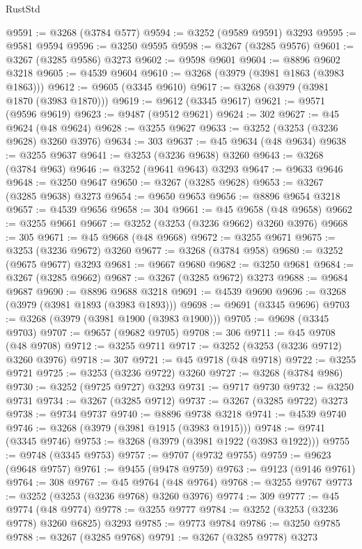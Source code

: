 \begin{lexlean}{RustStd}
\begin{coremodule}
{\begin{coremodule}
{{{{{{{{{{{{{{{{{{{{{{{{{{{{{{{{{{{{{{{@9591 := @3268 (@3784 @577)
@9594 := @3252 (@9589 @9591) @3293
@9595 := @9581 @9594
@9596 := @3250 @9595
@9598 := @3267 (@3285 @9576)
@9601 := @3267 (@3285 @9586) @3273
@9602 := @9598 @9601
@9604 := @8896 @9602 @3218
@9605 := @4539 @9604
@9610 := @3268 (@3979 (@3981 @1863 (@3983 @1863)))
@9612 := @9605 (@3345 @9610)
@9617 := @3268 (@3979 (@3981 @1870 (@3983 @1870)))
@9619 := @9612 (@3345 @9617)
@9621 := @9571 (@9596 @9619)
@9623 := @9487 (@9512 @9621)
@9624 := 302
@9627 := @45 @9624 (@48 @9624)
@9628 := @3255 @9627
@9633 := @3252 (@3253 (@3236 @9628) @3260 @3976)
@9634 := 303
@9637 := @45 @9634 (@48 @9634)
@9638 := @3255 @9637
@9641 := @3253 (@3236 @9638) @3260
@9643 := @3268 (@3784 @963)
@9646 := @3252 (@9641 @9643) @3293
@9647 := @9633 @9646
@9648 := @3250 @9647
@9650 := @3267 (@3285 @9628)
@9653 := @3267 (@3285 @9638) @3273
@9654 := @9650 @9653
@9656 := @8896 @9654 @3218
@9657 := @4539 @9656
@9658 := 304
@9661 := @45 @9658 (@48 @9658)
@9662 := @3255 @9661
@9667 := @3252 (@3253 (@3236 @9662) @3260 @3976)
@9668 := 305
@9671 := @45 @9668 (@48 @9668)
@9672 := @3255 @9671
@9675 := @3253 (@3236 @9672) @3260
@9677 := @3268 (@3784 @958)
@9680 := @3252 (@9675 @9677) @3293
@9681 := @9667 @9680
@9682 := @3250 @9681
@9684 := @3267 (@3285 @9662)
@9687 := @3267 (@3285 @9672) @3273
@9688 := @9684 @9687
@9690 := @8896 @9688 @3218
@9691 := @4539 @9690
@9696 := @3268 (@3979 (@3981 @1893 (@3983 @1893)))
@9698 := @9691 (@3345 @9696)
@9703 := @3268 (@3979 (@3981 @1900 (@3983 @1900)))
@9705 := @9698 (@3345 @9703)
@9707 := @9657 (@9682 @9705)
@9708 := 306
@9711 := @45 @9708 (@48 @9708)
@9712 := @3255 @9711
@9717 := @3252 (@3253 (@3236 @9712) @3260 @3976)
@9718 := 307
@9721 := @45 @9718 (@48 @9718)
@9722 := @3255 @9721
@9725 := @3253 (@3236 @9722) @3260
@9727 := @3268 (@3784 @986)
@9730 := @3252 (@9725 @9727) @3293
@9731 := @9717 @9730
@9732 := @3250 @9731
@9734 := @3267 (@3285 @9712)
@9737 := @3267 (@3285 @9722) @3273
@9738 := @9734 @9737
@9740 := @8896 @9738 @3218
@9741 := @4539 @9740
@9746 := @3268 (@3979 (@3981 @1915 (@3983 @1915)))
@9748 := @9741 (@3345 @9746)
@9753 := @3268 (@3979 (@3981 @1922 (@3983 @1922)))
@9755 := @9748 (@3345 @9753)
@9757 := @9707 (@9732 @9755)
@9759 := @9623 (@9648 @9757)
@9761 := @9455 (@9478 @9759)
@9763 := @9123 (@9146 @9761)
@9764 := 308
@9767 := @45 @9764 (@48 @9764)
@9768 := @3255 @9767
@9773 := @3252 (@3253 (@3236 @9768) @3260 @3976)
@9774 := 309
@9777 := @45 @9774 (@48 @9774)
@9778 := @3255 @9777
@9784 := @3252 (@3253 (@3236 @9778) @3260 @6825) @3293
@9785 := @9773 @9784
@9786 := @3250 @9785
@9788 := @3267 (@3285 @9768)
@9791 := @3267 (@3285 @9778) @3273
}}}}}}}}}}}}}}}}}}}}}}}}}}}}}}}}}}}}}}}
\end{coremodule}}
\end{coremodule}
\end{lexlean}
